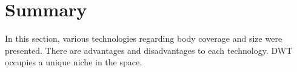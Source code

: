 
\section{Summary}
In this section, various technologies regarding body coverage and size were presented. There are advantages and disadvantages to each technology. DWT occupies a unique niche in the space. 


